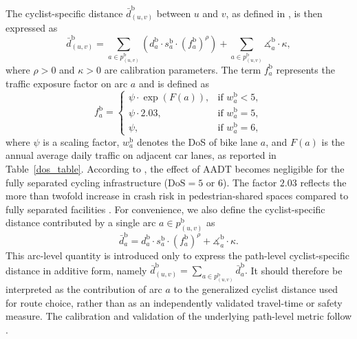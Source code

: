 \documentclass[lettersize,journal]{IEEEtran}
\begin{document}
The cyclist-specific distance $\bar{d}_{(u,v)}^\mathrm{b}$ between $u$ and $v$,
as defined in \cite{cooper2017using}, is then expressed as
\begin{equation}
\label{cyclist_distance}
    \bar{d}_{(u,v)}^\mathrm{b} = \sum_{a \in p_{(u,v)}^\mathrm{b}} 
    \left( d_a^\mathrm{b} \cdot s_a^\mathrm{b} \cdot (f_a^\mathrm{b})^{\rho} \right) 
    +  \sum_{a \in p_{(u,v)}^\mathrm{b}} \measuredangle_a^\mathrm{b} \cdot \kappa,
\end{equation}
where $\rho > 0$ and $\kappa > 0$ are calibration parameters. The term
$f_a^\mathrm{b}$ represents the traffic exposure factor on arc $a$ and is defined as
\begin{equation}
    f_a^\mathrm{b} =
    \begin{cases}
        \psi \cdot \exp{(F(a))}, & \text{if } w_a^\mathrm{b} < 5, \\
        \psi \cdot 2.03,         & \text{if } w_a^\mathrm{b} = 5, \\
        \psi,                    & \text{if } w_a^\mathrm{b} = 6,
    \end{cases}
\end{equation}
where $\psi$ is a scaling factor, $w_a^\mathrm{b}$ denotes the DoS of bike lane
$a$, and $F(a)$ is the annual average daily traffic on adjacent car lanes, as
reported in Table~\ref{dos_table}. According to \cite{cyclerap2024}, the effect of
AADT becomes negligible for the fully separated cycling infrastructure
($\text{DoS}=5$ or $6$). The factor $2.03$ reflects the more than twofold
increase in crash risk in pedestrian-shared spaces compared to fully separated
facilities \cite{mesimaki2021near}.
\noindent
For convenience, we also define the cyclist-specific distance contributed by
a single arc $a \in p_{(u,v)}^\mathrm{b}$ as
\begin{equation}
    \label{arc_cyclist_distance}
    \bar{d}_{a}^\mathrm{b}
    =
    d_a^\mathrm{b} \cdot s_a^\mathrm{b} \cdot (f_a^\mathrm{b})^{\rho}
    + \measuredangle_a^\mathrm{b} \cdot \kappa .
\end{equation}
This arc-level quantity is introduced only to express the path-level cyclist-specific
distance in additive form, namely $\bar{d}_{(u,v)}^\mathrm{b}
=
\sum_{a \in p_{(u,v)}^\mathrm{b}} \bar{d}_{a}^\mathrm{b}.$
It should therefore be interpreted as the contribution of arc $a$ to the generalized
cyclist distance used for route choice, rather than as an independently validated
travel-time or safety measure. The calibration and validation of the underlying
path-level metric follow \cite{cooper2017using}.
\end{document}

